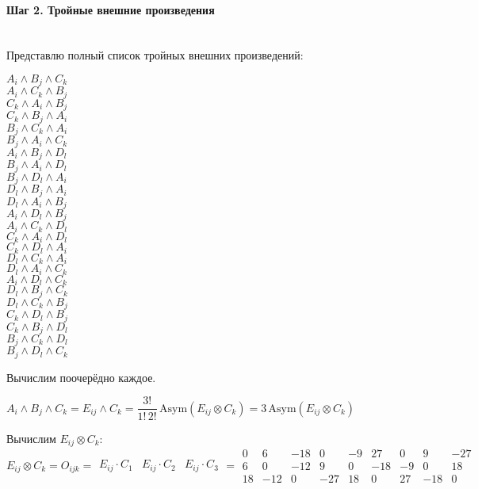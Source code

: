 \documentclass{article}
\begin{document}
\paragraph*{Шаг 2. Тройные внешние произведения} \, \\
Представлю полный список тройных внешних произведений:
\begin{multicols}{6}
\noindent $A_i \wedge B_j \wedge C_k$ \\
$A_i \wedge C_k \wedge B_j$ \\
$C_k \wedge A_i \wedge B_j$ \\
$C_k \wedge B_j \wedge A_i$ \\
$B_j \wedge C_k \wedge A_i$ \\
$B_j \wedge A_i \wedge C_k$ \\
$A_i \wedge B_j \wedge D_l$ \\
$B_j \wedge A_i \wedge D_l$ \\
$B_j \wedge D_l \wedge A_i$ \\
$D_l \wedge B_j \wedge A_i$ \\
$D_l \wedge A_i \wedge B_j$ \\
$A_i \wedge D_l \wedge B_j$ \\
$A_i \wedge C_k \wedge D_l$ \\
$C_k \wedge A_i \wedge D_l$ \\
$C_k \wedge D_l \wedge A_i$ \\
$D_l \wedge C_k \wedge A_i$ \\
$D_l \wedge A_i \wedge C_k$ \\
$A_i \wedge D_l \wedge C_k$ \\
$D_l \wedge B_j \wedge C_k$ \\
$D_l \wedge C_k \wedge B_j$ \\
$C_k \wedge D_l \wedge B_j$ \\
$C_k \wedge B_j \wedge D_l$ \\
$B_j \wedge C_k \wedge D_l$ \\
$B_j \wedge D_l \wedge C_k$
\end{multicols}
\noindent Вычислим поочерёдно каждое.
\begin{center}
$A_i \wedge B_j \wedge C_k = E_{ij} \wedge C_k = \dfrac{3!}{1!\,2!}\,\text{Asym}(E_{ij}\otimes C_k) = 3\,\text{Asym}(E_{ij}\otimes C_k)$
\end{center}
Вычислим $E_{ij}\otimes C_k$:
$$E_{ij}\otimes C_k = O_{ijk} = \begin{array}{||c|c|c||}
E_{ij}\cdot C_1 & E_{ij}\cdot C_2 & E_{ij}\cdot C_3
\end{array} = \begin{array}{||ccc|ccc|ccc||}
0 & 6 & -18 & 0 & -9 & 27 & 0 & 9 & -27 \\
6 & 0 & -12 & 9 & 0 & -18 & -9 & 0 & 18 \\
18 & -12 & 0 & -27 & 18 & 0 & 27 & -18 & 0
\end{array}$$
\end{document}
